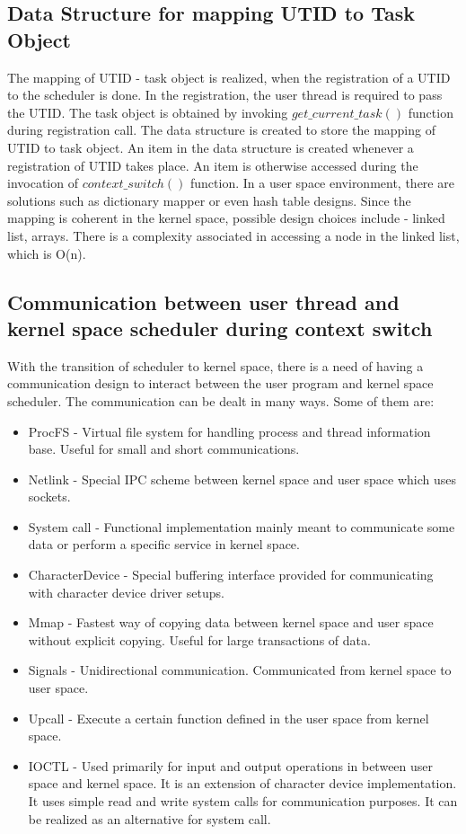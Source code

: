 \subsection{Data Structure for mapping UTID to Task Object}

The mapping of UTID - task object is realized, when the registration of a UTID to the scheduler is done. 
In the registration, the user thread is required to pass the UTID. 
The task object is obtained by invoking $get\_current\_task()$ function during registration call. 
The data structure is created to store the mapping of UTID to task object. 
An item in the data structure is created whenever a registration of UTID takes place. 
An item is otherwise accessed during the invocation of $context\_switch()$ function. 
In a user space environment, there are solutions such as dictionary mapper or even hash table designs. 
Since the mapping is coherent in the kernel space, possible design choices include - linked list, arrays. 
There is a complexity associated in accessing a node in the linked list, which is O(n).

\subsection{Communication between user thread and kernel space scheduler during context switch} 

With the transition of scheduler to kernel space, there is a need of having a communication design to interact between the user program and kernel space scheduler. 
The communication can be dealt in many ways\cite{commkernelanduser}. 
Some of them are:

\begin{itemize}
\item ProcFS - Virtual file system for handling process and thread information base. Useful for small and short communications. 
\item Netlink - Special IPC scheme between kernel space and user space which uses sockets. 
\item System call - Functional implementation mainly meant to communicate some data or perform a specific service in kernel space. 
\item CharacterDevice - Special buffering interface provided for communicating with character device driver setups.
\item Mmap - Fastest way of copying data between kernel space and user space without explicit copying. Useful for large transactions of data.
\item Signals - Unidirectional communication. Communicated from kernel space to user space. 
\item Upcall - Execute a certain function defined in the user space from kernel space.
\item IOCTL - Used primarily for input and output operations in between user space and kernel space. It is an extension of character device implementation. It uses simple read and write system calls for communication purposes. It can be realized as an alternative for system call.

\end{itemize}


